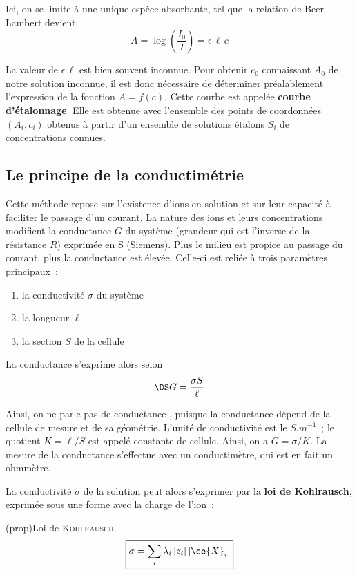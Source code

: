 \documentclass[../main/main.tex]{subfiles}
\begin{document}
{Ici, on se limite à une unique espèce absorbante, tel que la relation de
Beer-Lambert devient
\[\boxed{A = \log\left(\frac{I_0}{I}\right) = \epsilon \, \ell \, c}\]

La valeur de $\epsilon \, \ell$ est bien souvent inconnue. Pour
obtenir $c_0$ connaissant $A_0$ de notre solution inconnue, il est donc
nécessaire de déterminer préalablement l'expression de la fonction $A=f(c)$.
Cette courbe est appelée \textbf{courbe d'étalonnage}. Elle est obtenue avec
l'ensemble des points de coordonnées $(A_i, c_i)$ obtenus à partir d'un ensemble
de solutions étalons $S_i$ de concentrations connues.

\subsection{Le principe de la conductimétrie}

Cette méthode repose sur l'existence d'ions en solution et sur leur capacité à
faciliter le passage d'un courant. La nature des ions et leurs concentrations
modifient la conductance $G$ du système (grandeur qui est l'inverse de la
résistance $R$) exprimée en \si{S} (Siemens). Plus le milieu est propice au
passage du courant, plus la conductance est élevée. Celle-ci est reliée à trois
paramètres principaux~:

\begin{enumerate}
	\item la conductivité $\sigma$ du système
	\item la longueur $\ell$
	\item la section $S$ de la cellule
\end{enumerate}

La conductance s'exprime alors selon
\[\DS G = \frac{\sigma S}{\ell}\]

Ainsi, on ne parle pas de conductance , puisque la
conductance dépend de la cellule de mesure et de sa géométrie. L'unité de
conductivité est le $\si{S.m^{-1}}$~; le quotient $K = \ell / S$ est appelé
constante de cellule. Ainsi, on a $G = \sigma / K$. La mesure de la conductance
s'effectue avec un conductimètre, qui est en fait un ohmmètre.\bigbreak

La conductivité $\sigma$ de la solution peut alors s'exprimer par la \textbf{loi
	de Kohlrausch}, exprimée sous une forme avec la charge de l'ion~:
\begin{tcb}(prop){Loi de \textsc{Kohlrausch}}
	\[\boxed{\sigma = \sum_{i} \lambda_i \left|z_i\right| [\ce{X}_i]}\]


\end{tcb}}
\end{document}

